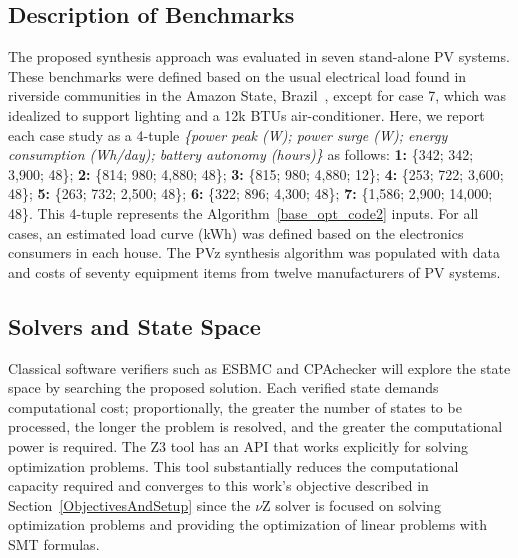 \documentclass[journal]{IEEEtran}
\begin{document}
\subsection{Description of Benchmarks}

The proposed synthesis approach was evaluated in seven stand-alone PV systems. These benchmarks were defined based on the usual electrical load found in riverside communities in the Amazon State, Brazil~\cite{TrindadeCordeiro19,Agrener2013}, except for case 7, which was idealized to support lighting and a 12k BTUs air-conditioner.  
Here, we report each case study as a 4-tuple \textit{\{power peak (W); power surge (W); energy consumption (Wh/day); battery autonomy (hours)\}} as follows:
  \textbf{1:} \{342; 342; 3,900; 48\}; \textbf{2:} \{814; 980; 4,880; 48\}; \textbf{3:} \{815; 980; 4,880; 12\}; \textbf{4:} \{253; 722; 3,600; 48\}; \textbf{5:} \{263; 732; 2,500; 48\}; \textbf{6:} \{322; 896; 4,300; 48\}; \textbf{7:} \{1,586; 2,900; 14,000; 48\}. This 4-tuple represents the Algorithm~\ref{base_opt_code2} inputs. For all cases, an estimated load curve (kWh) was defined based on the electronics consumers in each house. The PVz synthesis algorithm was populated with data and costs of seventy equipment items from twelve manufacturers of PV systems. 
%

\subsection{Solvers and State Space}
\label{sec:SolversandStateSpace}
  Classical software verifiers such as ESBMC and CPAchecker will explore the state space by searching the proposed solution. Each verified state demands computational cost; proportionally, the greater the number of states to be processed, the longer the problem is resolved, and the greater the computational power is required. The Z3 tool has an API that works explicitly for solving optimization problems. This tool substantially reduces the computational capacity required and converges to this work's objective described in Section~\ref{ObjectivesAndSetup} since the $\nu$Z solver is focused on solving optimization problems and providing the optimization of linear problems with SMT formulas.
\end{document}
